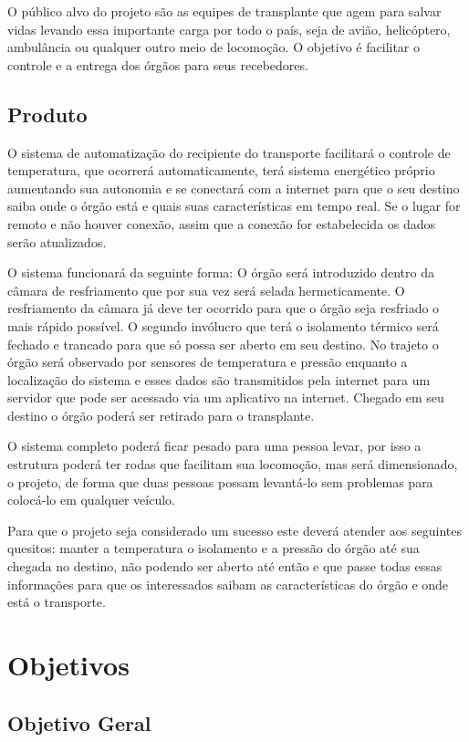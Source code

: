  O público alvo do projeto são as equipes de transplante que agem para salvar vidas levando essa importante carga por todo o país, seja de avião, helicóptero, ambulância ou qualquer outro meio de locomoção. O objetivo é facilitar o controle e a entrega dos órgãos para seus recebedores.

  \subsection{Produto}
  O sistema de automatização do recipiente do transporte facilitará o controle de temperatura, que ocorrerá automaticamente, terá sistema energético próprio aumentando sua autonomia e se conectará com a internet para que o seu destino saiba onde o órgão está e quais suas características em tempo real. Se o lugar for remoto e não houver conexão, assim que a conexão for estabelecida os dados serão atualizados.

  O sistema funcionará da seguinte forma: O órgão será introduzido dentro da câmara de resfriamento que por sua vez será selada hermeticamente. O resfriamento da câmara já deve ter ocorrido para que o órgão seja resfriado o mais rápido possível. O segundo invólucro que terá o isolamento térmico será fechado e trancado para que só possa ser aberto em seu destino. No trajeto o órgão será observado por sensores de temperatura e pressão enquanto a localização do sistema e esses dados são transmitidos pela internet para um servidor que pode ser acessado via um aplicativo na internet. Chegado em seu destino o órgão poderá ser retirado para o transplante.

  O sistema completo poderá ficar pesado para uma pessoa levar, por isso a estrutura poderá ter rodas que facilitam sua locomoção, mas será dimensionado, o projeto, de forma que duas pessoas possam levantá-lo sem problemas para colocá-lo em qualquer veículo.

  Para que o projeto seja considerado um sucesso este deverá atender aos seguintes quesitos: manter a temperatura o isolamento e a pressão do órgão até sua chegada no destino, não podendo ser aberto até então e que passe todas essas informações para que os interessados saibam as características do órgão e onde está o transporte.


\section{Objetivos}

\subsection{Objetivo Geral}

